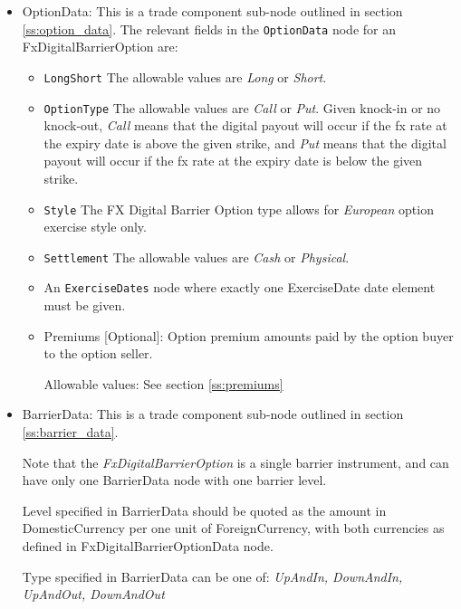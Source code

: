 \begin{itemize}

\item OptionData: This is a trade component sub-node outlined in section \ref{ss:option_data}. 
The relevant fields in the \lstinline!OptionData! node for an FxDigitalBarrierOption are:

\begin{itemize}
\item \lstinline!LongShort! The allowable values are \emph{Long} or \emph{Short}.

\item \lstinline!OptionType! The allowable values are \emph{Call} or \emph{Put}. Given knock-in or no knock-out,  \emph{Call} means that the digital payout will occur if the fx rate at the expiry date is above the given strike, and \emph{Put} means that the digital payout will occur if the fx rate at the expiry date is below the given strike.

\item  \lstinline!Style! The FX Digital Barrier Option type allows for \emph{European} option exercise style only.

\item  \lstinline!Settlement! The allowable values are \emph{Cash} or \emph{Physical}.

\item An \lstinline!ExerciseDates! node where exactly one ExerciseDate date element must be given.

\item Premiums [Optional]: Option premium amounts paid by the option buyer to the option seller.

Allowable values:  See section \ref{ss:premiums}

\end{itemize}

\item BarrierData: This is a trade component sub-node outlined in section \ref{ss:barrier_data}. 

Note that the \emph{FxDigitalBarrierOption} is a single barrier instrument, and can have only one BarrierData node with one barrier level.

Level specified in BarrierData should be quoted as the amount in DomesticCurrency per one unit of ForeignCurrency, with both currencies as defined in FxDigitalBarrierOptionData node.

Type specified in BarrierData can be one of: \emph{UpAndIn, DownAndIn, UpAndOut, DownAndOut}


\end{itemize}
